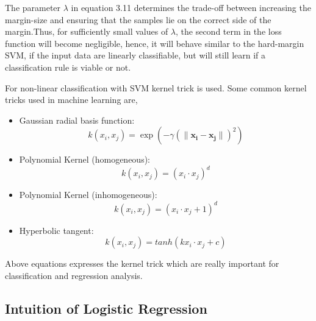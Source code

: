 The parameter $\lambda $ in equation 3.11 determines the trade-off between increasing the margin-size and ensuring that the samples lie on the correct side of the margin.Thus, for sufficiently small values of $\lambda $, the second term in the loss function will become negligible, hence, it will behave similar to the hard-margin SVM, if the input data are linearly classifiable, but will still learn if a classification rule is viable or not.
\par\noindent
For non-linear classification with SVM kernel trick is used. Some common kernel tricks used in machine learning are,
\begin{itemize}
    \item Gaussian radial basis function:
    \begin{equation}
         k(x_{i}, x_{j}) = \exp{(-\gamma(\lVert \mathbf{x_{i}-x_{j}} \rVert)^2)}
    \end{equation}
    \item Polynomial Kernel (homogeneous):
    \begin{equation}
        k(x_{i}, x_{j}) = (x_{i}\cdot x_{j})^d
    \end{equation}
     \item Polynomial Kernel (inhomogeneous):
     \begin{equation}
         k(x_{i}, x_{j}) = (x_{i}\cdot x_{j}+1)^d
     \end{equation}
    \item Hyperbolic tangent:
    \begin{equation}
       k(x_{i}, x_{j}) = tanh(kx_{i}\cdot x_{j}+c) 
    \end{equation}
\end{itemize}
Above equations expresses the kernel trick which are really important for classification and regression analysis.

\subsection{Intuition of Logistic Regression}